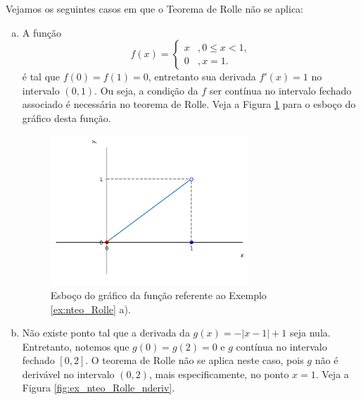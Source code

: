 \begin{ex}\label{ex:nteo_Rolle}
  Vejamos os seguintes casos em que o Teorema de Rolle não se aplica:
  \begin{enumerate}[a)]
  \item A função
    \begin{equation}
      f(x) = \left\{
        \begin{array}{ll}
          x &, 0\leq x < 1,\\
          0 &, x=1.
        \end{array}
      \right.
    \end{equation}
    é tal que $f(0)=f(1)=0$, entretanto sua derivada $f'(x)=1$ no intervalo $(0, 1)$. Ou seja, a condição da $f$ ser contínua no intervalo fechado associado é necessária no teorema de Rolle. Veja a Figura \ref{fig:ex_fcont_h_2} para o esboço do gráfico desta função.
    
  \begin{figure}[H]
    \centering
    \includegraphics[width=0.7\textwidth]{./cap_apderiv/dados/fig_ex_fcont/fig_h}
    \caption{Esboço do gráfico da função referente ao Exemplo \ref{ex:nteo_Rolle} a).}
    \label{fig:ex_fcont_h_2}
  \end{figure}
  
\item Não existe ponto tal que a derivada da $g(x)=-|x-1|+1$ seja nula. Entretanto, notemos que $g(0)=g(2)=0$ e $g$ contínua no intervalo fechado $[0, 2]$. O teorema de Rolle não se aplica neste caso, pois $g$ não é derivável no intervalo $(0,2)$, mais especificamente, no ponto $x=1$. Veja a Figura \ref{fig:ex_nteo_Rolle_nderiv}.


\end{enumerate}
\end{ex}
